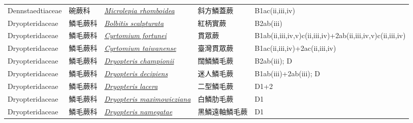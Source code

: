 {\begin{longtable}{p{2.5cm}p{2cm}p{5cm}p{2.5cm}p{3cm}}
    Dennstaedtiaceae & 碗蕨科 & \href{http://www.theplantlist.org/tpl1.1/search?q=Microlepia+rhomboidea}{\textit{Microlepia rhomboidea} } & 斜方鱗蓋蕨 & B1ac(ii,iii,iv) \index{Microlepia@\textit{Microlepia}!rhomboidea@\textit{rhomboidea}}  \index{斜方鱗蓋蕨} \\
    Dryopteridaceae & 鱗毛蕨科 & \href{http://www.theplantlist.org/tpl1.1/search?q=Bolbitis+scalpturata}{\textit{Bolbitis scalpturata} } & 紅柄實蕨 & B2ab(iii) \index{Bolbitis@\textit{Bolbitis}!scalpturata@\textit{scalpturata}}  \index{紅柄實蕨} \\
    Dryopteridaceae & 鱗毛蕨科 & \href{http://www.theplantlist.org/tpl1.1/search?q=Cyrtomium+fortunei}{\textit{Cyrtomium fortunei} } & 貫眾蕨 & B1ab(ii,iii,iv,v)c(ii,iii,iv)+2ab(ii,iii,iv,v)c(ii,iii,iv) \index{Cyrtomium@\textit{Cyrtomium}!fortunei@\textit{fortunei}}  \index{貫眾蕨} \\
    Dryopteridaceae & 鱗毛蕨科 & \href{http://www.theplantlist.org/tpl1.1/search?q=Cyrtomium+taiwanense}{\textit{Cyrtomium taiwanense} } & 臺灣貫眾蕨 & B1ac(ii,iii,iv)+2ac(ii,iii,iv) \index{Cyrtomium@\textit{Cyrtomium}!taiwanense@\textit{taiwanense}}  \index{臺灣貫眾蕨} \\
    Dryopteridaceae & 鱗毛蕨科 & \href{http://www.theplantlist.org/tpl1.1/search?q=Dryopteris+championii}{\textit{Dryopteris championii} } & 闊鱗鱗毛蕨 & B2ab(iii); D \index{Dryopteris@\textit{Dryopteris}!championii@\textit{championii}}  \index{闊鱗鱗毛蕨} \\
    Dryopteridaceae & 鱗毛蕨科 & \href{http://www.theplantlist.org/tpl1.1/search?q=Dryopteris+decipiens}{\textit{Dryopteris decipiens} } & 迷人鱗毛蕨 & B1ab(iii)+2ab(iii); D \index{Dryopteris@\textit{Dryopteris}!decipiens@\textit{decipiens}}  \index{迷人鱗毛蕨} \\
    Dryopteridaceae & 鱗毛蕨科 & \href{http://www.theplantlist.org/tpl1.1/search?q=Dryopteris+lacera}{\textit{Dryopteris lacera} } & 二型鱗毛蕨 & D1+2 \index{Dryopteris@\textit{Dryopteris}!lacera@\textit{lacera}}  \index{二型鱗毛蕨} \\
    Dryopteridaceae & 鱗毛蕨科 & \href{http://www.theplantlist.org/tpl1.1/search?q=Dryopteris+maximowicziana}{\textit{Dryopteris maximowicziana} } & 白鱗肋毛蕨 & D1 \index{Dryopteris@\textit{Dryopteris}!maximowicziana@\textit{maximowicziana}}  \index{白鱗肋毛蕨} \\
    Dryopteridaceae & 鱗毛蕨科 & \href{http://www.theplantlist.org/tpl1.1/search?q=Dryopteris+namegatae}{\textit{Dryopteris namegatae} } & 黑鱗遠軸鱗毛蕨 & D1 \index{Dryopteris@\textit{Dryopteris}!namegatae@\textit{namegatae}}  \index{黑鱗遠軸鱗毛蕨} \\

\end{longtable}}

